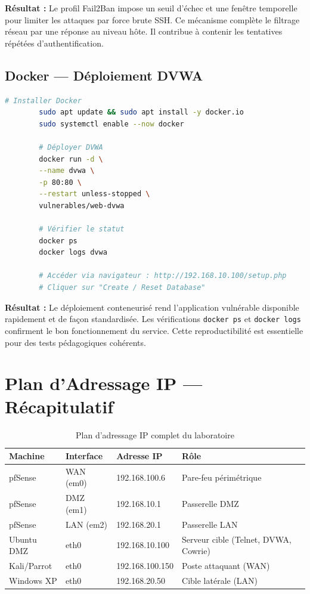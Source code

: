 \documentclass[12pt,a4paper,openany]{report}
\begin{document}
	\textbf{Résultat :} Le profil Fail2Ban impose un seuil d’échec et une fenêtre temporelle pour limiter les attaques par force brute SSH. Ce mécanisme complète le filtrage réseau par une réponse au niveau hôte. Il contribue à contenir les tentatives répétées d’authentification.
	
	\subsection{Docker — Déploiement DVWA}
	\begin{lstlisting}[language=bash, caption={Déploiement DVWA dans la DMZ via Docker}]
		# Installer Docker
		sudo apt update && sudo apt install -y docker.io
		sudo systemctl enable --now docker
		
		# Déployer DVWA
		docker run -d \
		--name dvwa \
		-p 80:80 \
		--restart unless-stopped \
		vulnerables/web-dvwa
		
		# Vérifier le statut
		docker ps
		docker logs dvwa
		
		# Accéder via navigateur : http://192.168.10.100/setup.php
		# Cliquer sur "Create / Reset Database"
	\end{lstlisting}
	
	\textbf{Résultat :} Le déploiement conteneurisé rend l’application vulnérable disponible rapidement et de façon standardisée. Les vérifications \texttt{docker ps} et \texttt{docker logs} confirment le bon fonctionnement du service. Cette reproductibilité est essentielle pour des tests pédagogiques cohérents.
	
	\section{Plan d'Adressage IP — Récapitulatif}
	\label{sec:app-ip-plan}
	
	\begin{table}[H]
		\centering
		\caption{Plan d'adressage IP complet du laboratoire}
		\label{tab:lab-ip-plan}
		\begin{tabularx}{\textwidth}{|l|l|l|X|}
			\hline
			\rowcolor{primary!20}
			\textbf{Machine} & \textbf{Interface} & \textbf{Adresse IP} & \textbf{Rôle} \\
			\hline
			pfSense & WAN (em0) & 192.168.100.6 & Pare-feu périmétrique \\
			\hline
			\rowcolor{tablerowalt}
			pfSense & DMZ (em1) & 192.168.10.1 & Passerelle DMZ \\
			\hline
			pfSense & LAN (em2) & 192.168.20.1 & Passerelle LAN \\
			\hline
			\rowcolor{tablerowalt}
			Ubuntu DMZ & eth0 & 192.168.10.100 & Serveur cible (Telnet, DVWA, Cowrie) \\
			\hline
			Kali/Parrot & eth0 & 192.168.100.150 & Poste attaquant (WAN) \\
			\hline
			\rowcolor{tablerowalt}
			Windows XP & eth0 & 192.168.20.50 & Cible latérale (LAN) \\
			\hline
		\end{tabularx}
	\end{table}
	
\end{document}
